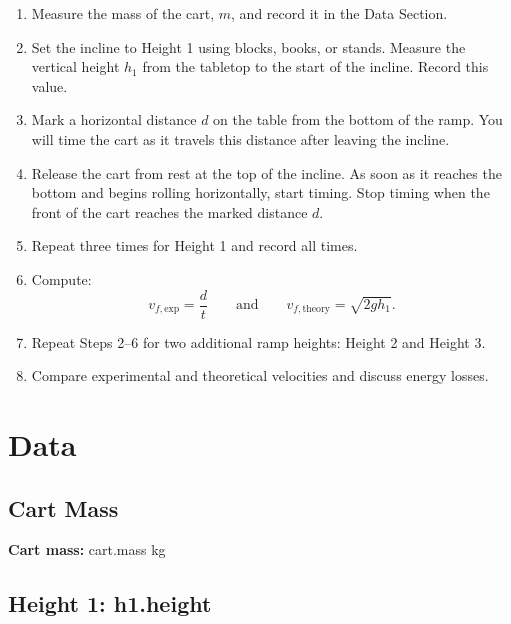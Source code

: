 \documentclass[12pt]{article}
\begin{document}
\begin{enumerate}[label=\arabic*.]

    \item Measure the mass of the cart, $m$, and record it in the Data Section.

    \item Set the incline to Height 1 using blocks, books, or stands. Measure the vertical height $h_1$ from the tabletop to the start of the incline. Record this value.

    \item Mark a horizontal distance $d$ on the table from the bottom of the ramp. You will time the cart as it travels this distance after leaving the incline.

    \item Release the cart from rest at the top of the incline. As soon as it reaches the bottom and begins rolling horizontally, start timing. Stop timing when the front of the cart reaches the marked distance $d$.

    \item Repeat three times for Height 1 and record all times.

    \item Compute:
    \[
    v_{f,\text{exp}} = \frac{d}{t} \qquad\text{and}\qquad v_{f,\text{theory}} = \sqrt{2 g h_1}.
    \]

    \item Repeat Steps 2–6 for two additional ramp heights: Height 2 and Height 3.

    \item Compare experimental and theoretical velocities and discuss energy losses.

\end{enumerate}

\section*{Data}

\subsection*{Cart Mass}
\textbf{Cart mass:} {{ cart.mass }} kg


\subsection*{Height 1: {{ h1.height }}}
\end{document}
